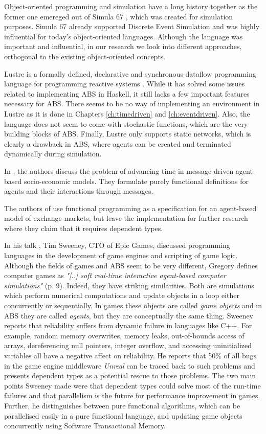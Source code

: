 Object-oriented programming and simulation have a long history together as the former one emereged out of Simula 67 \cite{dahl_birth_2002}, which was created for simulation purposes. Simula 67 already supported Discrete Event Simulation and was highly influential for today's object-oriented languages. Although the language was important and influential, in our research we look into different approaches, orthogonal to the existing object-oriented concepts.

Lustre is a formally defined, declarative and synchronous dataflow programming language for programming reactive systems \cite{halbwachs_synchronous_1991}. While it has solved some issues related to implementing ABS in Haskell, it still lacks a few important features necessary for ABS. There seems to be no way of implementing an environment in Lustre as it is done in Chapters \ref{ch:timedriven} and \ref{ch:eventdriven}. Also, the language does not seem to come with stochastic functions, which are the very building blocks of ABS. Finally, Lustre only supports static networks, which is clearly a drawback in ABS, where agents can be created and terminated dynamically during simulation.

In \cite{botta_time_2010}, the authors discuss the problem of advancing time in message-driven agent-based socio-economic models. They formulate purely functional definitions for agents and their interactions through messages.

The authors of \cite{botta_functional_2011} use functional programming as a specification for an agent-based model of exchange markets, but leave the implementation for further research where they claim that it requires dependent types.

In his talk \cite{sweeney_next_2006}, Tim Sweeney, CTO of Epic Games, discussed programming languages in the development of game engines and scripting of game logic. Although the fields of games and ABS seem to be very different, Gregory \cite{gregory_game_2018} defines computer games as \textit{"[..] soft real-time interactive agent-based computer simulations"} (p. 9). Indeed, they have striking similarities. Both are simulations which perform numerical computations and update objects in a loop either concurrently or sequentially. In games these objects are called \textit{game objects} and in ABS they are called \textit{agents}, but they are conceptually the same thing.  Sweeney reports that reliability suffers from dynamic failure in languages like C++. For example, random memory overwrites, memory leaks, out-of-bounds access of arrays, dereferencing null pointers, integer overflow, and accessing uninitialized variables all have a negative affect on reliability. He reports that 50\% of all bugs in the game engine middleware \textit{Unreal} can be traced back to such problems and presents dependent types as a potential rescue to those problems. The two main points Sweeney made were that dependent types could solve most of the run-time failures and that parallelism is the future for performance improvement in games. Further, he distinguishes between pure functional algorithms, which can be parallelised easily in a pure functional language, and updating game objects concurrently using Software Transactional Memory.